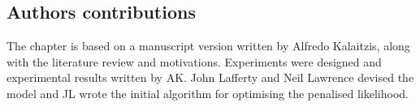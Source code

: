   \subsection*{Authors contributions}
    The chapter is based on a manuscript version written by Alfredo Kalaitzis, along with the literature review and motivations.
    Experiments were designed and experimental results written by AK.
    John Lafferty and Neil Lawrence devised the model and JL wrote the initial algorithm for optimising the penalised likelihood. 



